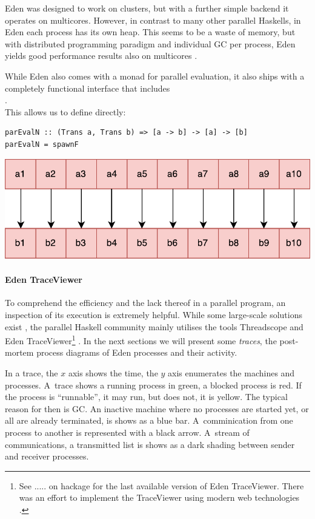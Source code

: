 Eden was designed to work on clusters, but with a further simple backend it operates on multicores. However, in contrast to many other parallel Haskells, in Eden each process has its own heap. This seems to be a waste of memory, but with distributed programming paradigm and individual GC per process, Eden yields good performance results also on multicores \cite{arcs-dc,no_pain}.

While Eden also comes with a monad  for parallel evaluation, it also ships with a completely functional interface that includes
\\
.
\\
This allows us to define  directly:

\begin{lstlisting}[frame=htrbl]
parEvalN :: (Trans a, Trans b) => [a -> b] -> [a] -> [b]
parEvalN = spawnF 
\end{lstlisting}
\begin{center}
	\includegraphics[scale=0.5]{images/parEvalNEden}
\end{center}

\paragraph{Eden TraceViewer}
To comprehend the efficiency and the lack thereof in a parallel program, an inspection of its execution is extremely helpful. While some large-scale solutions exist \cite{Geimer2010}, the parallel Haskell community mainly utilises the tools Threadscope \cite{Wheeler2009} and Eden TraceViewer\footnote{See ..... on hackage for the last available version of Eden TraceViewer. There was an effort to implement the TraceViewer using modern web technologies \cite{traceviewer-web}.} \cite{Berthold2007a}. In the next sections we will present some \emph{traces}, the post-mortem process diagrams of Eden processes and their activity.

In a trace, the $x$ axis shows the time, the $y$ axis enumerates the machines and processes. A~trace shows a running process in green, a blocked process is red. If the process is \enquote{runnable}, \ie it may run, but does not, it is yellow. The typical reason for then is GC. An inactive machine where no processes are started yet, or all are already terminated, is shows as a blue bar. A~comminication from one process to another is represented with a black arrow. A~stream of communications, \eg a transmitted list is shows as a dark shading between sender and receiver processes.



